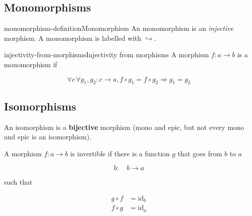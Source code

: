 \documentclass[preview]{standalone}
\begin{document}
\subsection{Monomorphisms}

\begin{snippetdefinition}{monomorphism-definition}{Monomorphism}
    An monomorphism is an \textit{injective} morphism.
    A monomorphism is labelled with \(\hookrightarrow\).
\end{snippetdefinition}

\begin{snippetdefinition}{injectivity-from-morphisms}{Injectivity from morphisms}
    A morphism \(f: a \rightarrow b\) is a monomorphism if
    
    \[
        \forall c\, \forall g_1, g_2: c \rightarrow a, 
        f \circ g_1 = f \circ g_2 \Rightarrow g_1 = g_2
    \]

    \begin{center}
    \end{center}
\end{snippetdefinition}

\subsection{Isomorphisms}

An isomorphism is a \textbf{bijective} morphism (mono and epic, but not every mono and epic
is an isomorphism).

A morphism \(f: a \rightarrow b\) is invertible if there
is a function \(g\) that goes from \(b\) to \(a\)

\[
    b:\quad b \rightarrow a
\]

such that

\begin{align*}
    g \circ f &= \text{id}_b
    \\
    f \circ g &= \text{id}_a
\end{align*}

\begin{center}
\end{center}
\end{document}
